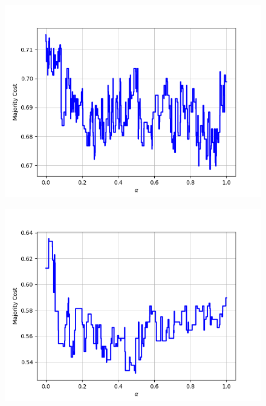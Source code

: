\begin{figure}[H]\ContinuedFloat
\centering
\begin{minipage}{.24\textwidth}
  \centering
  {\includegraphics[width=\linewidth]{plots/omniglot-intra-ac-cnn/Futurama}}
\end{minipage}
\begin{minipage}{.24\textwidth}
  \centering
  {\includegraphics[width=\linewidth]{plots/omniglot-intra-ac-cnn/Grantha}}
\end{minipage}
\begin{minipage}{.24\textwidth}
  \centering

\end{minipage}
\end{figure}
